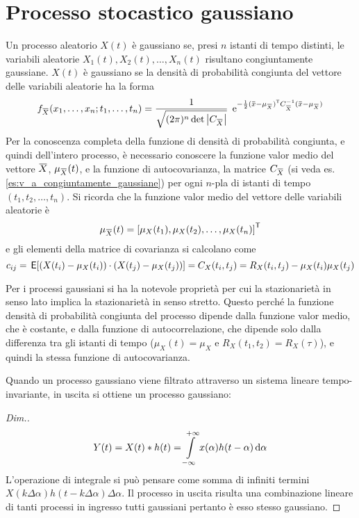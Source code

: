 \section{Processo stocastico gaussiano}
Un processo aleatorio $X(t)$ è gaussiano se, presi $n$ istanti di tempo distinti, le variabili aleatorie $X_1(t),X_2(t),\dots,X_n(t)$ risultano congiuntamente gaussiane.
$X(t)$ è gaussiano se la densità di probabilità congiunta del vettore delle variabili aleatorie ha la forma
\begin{equation}
	f_\vect{X}(x_1,\dots,x_n;t_1,\dots,t_n)=\frac{1}{\sqrt{(2\pi)^n\det\abs{ C_\vect{X}}}}\;\e{-\frac{1}{2}\trasp{(\vect{x}-\mu_\vect{X})}C^{-1}_\vect{X}(\vect{x}-\mu_\vect{X})}
\end{equation}
Per la conoscenza completa della funzione di densità di probabilità congiunta, e quindi dell'intero processo, è necessario conoscere la funzione valor medio del vettore $\vect{X}$, $\mu_\vect{X}(t)$, e la funzione di autocovarianza, la matrice $C_\vect{X}$ (si veda es.\ref{es:v_a_congiuntamente_gaussiane}) per ogni $n$-pla di istanti di tempo $(t_1,t_2,\dots,t_n)$. Si ricorda che la funzione valor medio del vettore delle variabili aleatorie è
\[
	\mu_\vect{X}(t)=\trasp{[\mu_X(t_1),\mu_X(t_2),\dots,\mu_X(t_n)]}
\]
e gli elementi della matrice di covarianza si calcolano come
\[
	c_{ij}=\,{\operatorname{\mathsf{E}}}\!\left[{(X(t_i)-\mu_X(t_i))\cdot (X(t_j)-\mu_X(t_j))}\right]=C_X(t_i,t_j)=R_X(t_i,t_j)-\mu_X(t_i)\mu_X(t_j)
\]

Per i processi gaussiani si ha la notevole proprietà per cui la stazionarietà in senso lato implica la stazionarietà in senso stretto. Questo perché la funzione densità di probabilità congiunta del processo dipende dalla funzione valor medio, che è costante, e dalla funzione di autocorrelazione, che dipende solo dalla differenza tra gli istanti di tempo ($\mu_X(t)=\mu_X$ e $R_X(t_1,t_2)=R_X(\tau)$), e quindi la stessa funzione di autocovarianza.

Quando un processo gaussiano viene filtrato attraverso un sistema lineare tempo-invariante, in uscita si ottiene un processo gaussiano:
\begin{proof}[Dim.]
\[
	Y(t)=X(t)\ast h(t)=\int\limits_{-\infty}^{+\infty}{x(\alpha)h(t-\alpha)}{\,\mathop{}\!\mathrm{d}{\alpha}}
\]
L'operazione di integrale si può pensare come somma di infiniti termini $X(k\Delta\alpha)h(t-k\Delta\alpha)\Delta\alpha$. Il processo in uscita risulta una combinazione lineare di tanti processi in ingresso tutti gaussiani pertanto è esso stesso gaussiano.
\end{proof}

